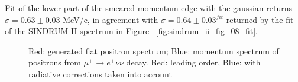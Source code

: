 Fit of the lower part of the smeared momentum edge with the gaussian returns
$\sigma = 0.63 \pm 0.03$ MeV/c, in agreement with $\sigma = 0.64 \pm 0.03^{fit}$
returned by the fit of the SINDRUM-II spectrum in Figure ~\ref{fig:sindrum_ii_fig_08_fit}.

\begin{figure} \label{fig:sindrum_ii_michel_calibration}
\caption{
  Red: generated flat positron spectrum;
  Blue: momentum spectrum of positrons from $\mu^+ \rightarrow e^+ \nu \bar{\nu}$
  decay. Red: leading order, Blue: with radiative corrections taken into account
}
\end{figure}

